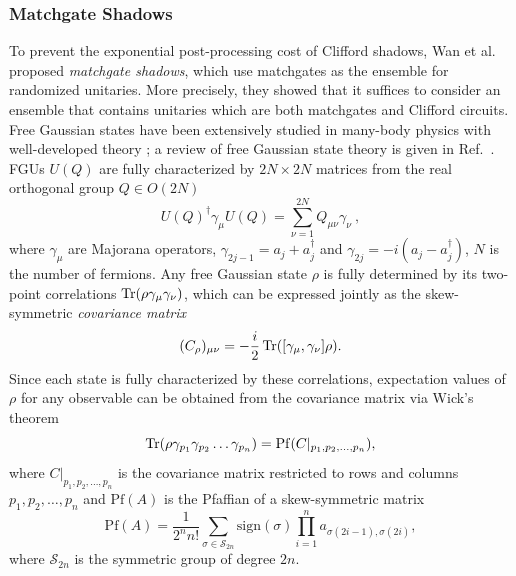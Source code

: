 \documentclass[../main.tex]{subfiles}
\begin{document}
\subsubsection{Matchgate Shadows}\label{subsub:matchgate}
To prevent the exponential post-processing cost of Clifford shadows, Wan et al. \cite{wan2022matchgate}  proposed \textit{matchgate shadows}, which use matchgates as the ensemble for randomized unitaries. More precisely, they showed that it suffices to consider an ensemble that contains unitaries which are both matchgates and Clifford circuits. Free Gaussian states have been extensively studied in many-body physics with well-developed theory \cite{lifshitz2013statistical, onsager1944crystal, fidkowski2011topological}; a review of free Gaussian state theory is given in Ref.~\cite{surace2022fermionic}. FGUs $U(Q)$ are fully characterized by $2N\times2N$ matrices from the real orthogonal group $Q \in O(2N)$
\begin{equation}
U(Q)^\dagger\gamma_\mu U(Q)=\sum_{\nu=1}^{2N}Q_{\mu\nu}\gamma_\nu~,
\end{equation}
where $\gamma_\mu$ are Majorana operators, $\gamma_{2j-1}=a_j+a_j^\dagger$ and $\gamma_{2j}=-i(a_j-a_j^\dagger)$, $N$ is the number of fermions.  Any free Gaussian state  $\rho$ is fully determined by its two-point correlations $\Tr(\rho \gamma_\mu \gamma_\nu)$, which can be expressed jointly as the skew-symmetric \textit{covariance matrix}
\begin{equation}
    (C_\rho)_{\mu \nu} = - \frac{i}{2} \Tr([\gamma_\mu, \gamma_\nu] \rho).
\end{equation} Since each state is fully characterized by these correlations, expectation values of $\rho$ for any observable can be obtained from the covariance matrix via Wick's theorem
\begin{equation}
    \Tr(\rho \gamma_{p_1} \gamma_{p_2} \dots \gamma_{p_n} ) = \mathrm{Pf}(C|_{p_1,p_2,\dots,p_n}),
\end{equation} where $C|_{p_1,p_2,\dots,p_n}$ is the covariance matrix restricted to rows and columns $p_1,p_2,\dots,p_n$ and $\mathrm{Pf}(A)$ is the Pfaffian of a skew-symmetric matrix
\begin{equation}
    \mathrm{Pf}(A) = \frac{1}{2^n n!} \sum_{\sigma \in \mathcal{S}_{2n}} \mathrm{sign}(\sigma) \prod_{i=1}^n a_{\sigma(2i -1), \sigma(2i)}, 
\end{equation} where $\mathcal{S}_{2n}$ is the symmetric group of degree $2n$. 
\end{document}
